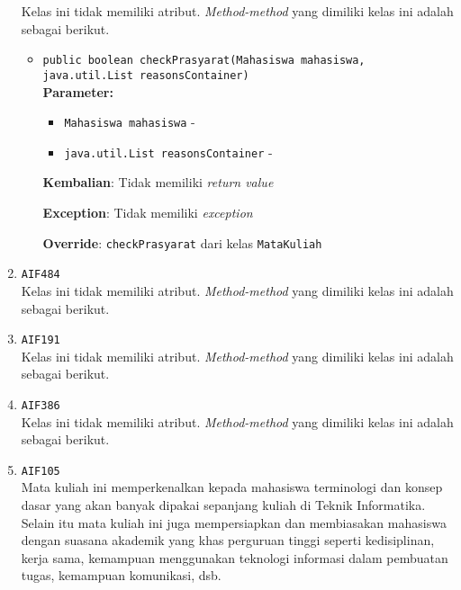 \documentclass{article}
\begin{document}
\begin{enumerate}
Kelas ini tidak memiliki atribut. \textit{Method-method} yang dimiliki kelas ini adalah sebagai berikut.
\begin{itemize}
\item \texttt{public boolean checkPrasyarat(Mahasiswa mahasiswa, java.util.List reasonsContainer)}\\ 


\textbf{Parameter:}\begin{itemize}
\item \texttt{Mahasiswa mahasiswa} - 
\item \texttt{java.util.List reasonsContainer} - 
\end{itemize}
\textbf{Kembalian}: Tidak memiliki \textit{return value}

\textbf{Exception}: Tidak memiliki \textit{exception}

\textbf{Override}: \texttt{checkPrasyarat} dari kelas \texttt{MataKuliah}

\end{itemize}
\item \texttt{AIF484}\\ 
Kelas ini tidak memiliki atribut. \textit{Method-method} yang dimiliki kelas ini adalah sebagai berikut.
\begin{itemize}
\end{itemize}
\item \texttt{AIF191}\\ 
Kelas ini tidak memiliki atribut. \textit{Method-method} yang dimiliki kelas ini adalah sebagai berikut.
\begin{itemize}
\end{itemize}
\item \texttt{AIF386}\\ 
Kelas ini tidak memiliki atribut. \textit{Method-method} yang dimiliki kelas ini adalah sebagai berikut.
\begin{itemize}
\end{itemize}
\item \texttt{AIF105}\\ 
Mata kuliah ini memperkenalkan kepada mahasiswa terminologi dan konsep dasar 
 yang akan banyak dipakai sepanjang kuliah di Teknik Informatika. Selain itu 
 mata kuliah ini juga mempersiapkan dan membiasakan mahasiswa dengan suasana 
 akademik yang khas perguruan tinggi seperti kedisiplinan, kerja sama, 
 kemampuan menggunakan teknologi informasi dalam pembuatan tugas, kemampuan 
 komunikasi, dsb.


\end{enumerate}
\end{document}
